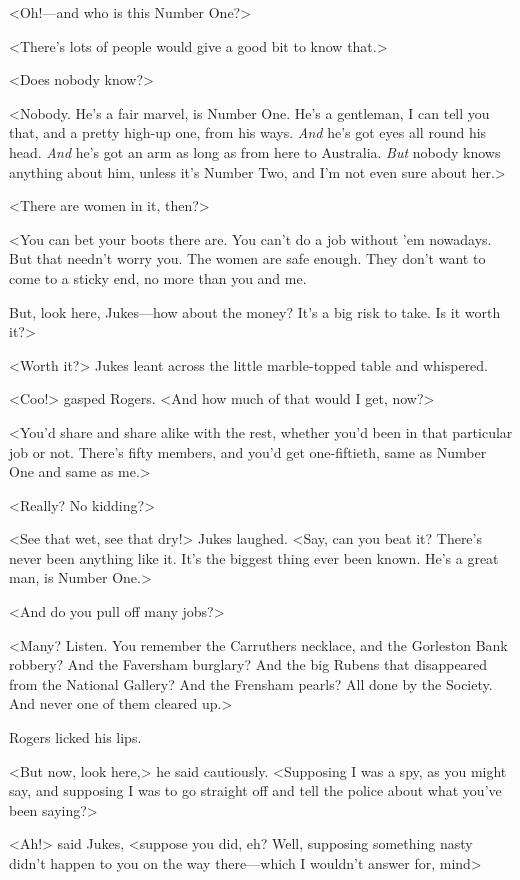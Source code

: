 <Oh!—and who is this Number One?>

<There's lots of people would give a good bit to know that.>

<Does nobody know?>

<Nobody. He's a fair marvel, is Number One. He's a gentleman, I can tell you that, and a pretty high-up one, from his ways. \textit{And} he's got eyes all round his head. \textit{And} he's got an arm as long as from here to Australia. \textit{But} nobody knows anything about him, unless it's Number Two, and I'm not even sure about her.>

<There are women in it, then?>

<You can bet your boots there are. You can't do a job without 'em nowadays. But that needn't worry you. The women are safe enough. They don't want to come to a sticky end, no more than you and me.

But, look here, Jukes—how about the money? It's a big risk to take. Is it worth it?>

<Worth it?> Jukes leant across the little marble-topped table and whispered.

<Coo!> gasped Rogers. <And how much of that would I get, now?>

<You'd share and share alike with the rest, whether you'd been in that particular job or not. There's fifty members, and you'd get one-fiftieth, same as Number One and same as me.>

<Really? No kidding?>

<See that wet, see that dry!> Jukes laughed. <Say, can you beat it? There's never been anything like it. It's the biggest thing ever been known. He's a great man, is Number One.>

<And do you pull off many jobs?>

<Many? Listen. You remember the Carruthers necklace, and the Gorleston Bank robbery? And the Faversham burglary? And the big Rubens that disappeared from the National Gallery? And the Frensham pearls? All done by the Society. And never one of them cleared up.>

Rogers licked his lips.

<But now, look here,> he said cautiously. <Supposing I was a spy, as you might say, and supposing I was to go straight off and tell the police about what you've been saying?>

<Ah!> said Jukes, <suppose you did, eh? Well, supposing something nasty didn't happen to you on the way there—which I wouldn't answer for, mind\longdash>

